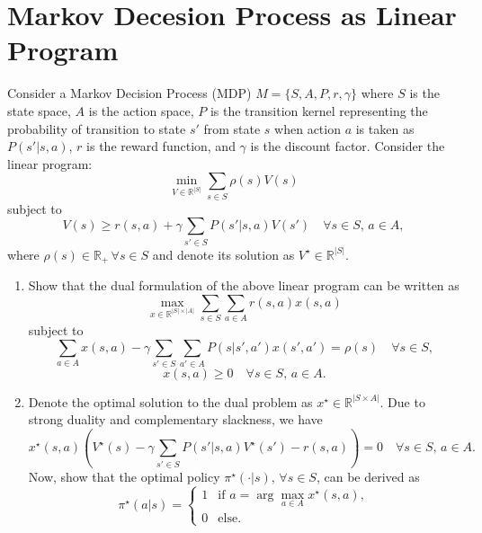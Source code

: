 \documentclass[a3paper,12pt]{extarticle} %
\begin{document}
\newpage
\section{Markov Decesion Process as Linear Program}
Consider a Markov Decision Process (MDP) $M = \{S, A, P, r, \gamma\}$ where $S$ is the state space, $A$ is the action space, $P$ is the transition kernel representing the probability of transition to state $s'$ from state $s$ when action $a$ is taken as $P(s'|s, a)$, $r$ is the reward function, and $\gamma$ is the discount factor. Consider the linear program:
\[
\min_{V \in \mathbb{R}^{|S|}} \sum_{s \in S} \rho(s)V(s)
\]
subject to
\[
V(s) \geq r(s, a) + \gamma \sum_{s' \in S} P(s'|s, a)V(s') \quad \forall s \in S, \, a \in A,
\]
where $\rho(s) \in \mathbb{R}_+ \, \forall s \in S$ and denote its solution as $V^\star \in \mathbb{R}^{|S|}$.

\begin{enumerate}
    \item Show that the dual formulation of the above linear program can be written as
    \[
    \max_{x \in \mathbb{R}^{|S| \times |A|}} \sum_{s \in S} \sum_{a \in A} r(s, a)x(s, a)
    \]
    subject to
    \[
    \sum_{a \in A} x(s, a) - \gamma \sum_{s' \in S} \sum_{a' \in A} P(s|s', a')x(s', a') = \rho(s) \quad \forall s \in S,
    \]
    \[
    x(s, a) \geq 0 \quad \forall s \in S, \, a \in A.
    \]
   \item Denote the optimal solution to the dual problem as $x^\star \in \mathbb{R}^{|S \times A|}$. Due to strong duality
    and complementary slackness, we have
    \[
    x^\star(s, a) \left(V^\star(s) - \gamma \sum_{s' \in S} P(s'|s, a)V^\star(s') - r(s, a)\right) = 0 \quad \forall s \in S, \, a \in A.
    \]
    Now, show that the optimal policy $\pi^\star(\cdot|s), \, \forall s \in S$, can be derived as
    \[
    \pi^\star(a|s) =
    \begin{cases}
    1 & \text{if } a = \arg \max_{a \in A} x^\star(s, a), \\
    0 & \text{else}.
    \end{cases}
    \]
\end{enumerate}
\end{document}
